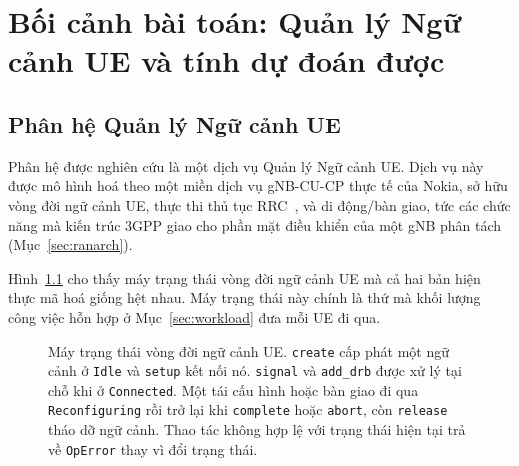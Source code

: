 \chapter{Bối cảnh bài toán: Quản lý Ngữ cảnh UE và tính dự đoán được\label{chapter:context}}

\section{Phân hệ Quản lý Ngữ cảnh UE}\label{sec:uecm}
Phân hệ được nghiên cứu là một dịch vụ Quản lý Ngữ cảnh UE. Dịch vụ này được mô hình hoá theo
một miền dịch vụ gNB-CU-CP thực tế của Nokia, sở hữu vòng đời ngữ cảnh UE, thực thi thủ tục
RRC~\cite{3gpp38331}, và di động/bàn giao, tức các chức năng mà kiến trúc 3GPP giao cho phần
mặt điều khiển của một gNB phân tách (Mục~\ref{sec:ranarch}).

Hình~\ref{fig:fsm} cho thấy máy trạng thái vòng đời ngữ cảnh UE mà cả hai bản hiện thực mã hoá
giống hệt nhau. Máy trạng thái này chính là thứ mà khối lượng công việc hỗn hợp ở
Mục~\ref{sec:workload} đưa mỗi UE đi qua.

\begin{figure}[ht]
\centering
{}
\caption[Máy trạng thái vòng đời ngữ cảnh UE]{Máy trạng thái vòng đời ngữ cảnh UE. \texttt{create} cấp phát một ngữ cảnh ở
\texttt{Idle} và \texttt{setup} kết nối nó. \texttt{signal} và \texttt{add\_drb} được xử lý tại
chỗ khi ở \texttt{Connected}. Một tái cấu hình hoặc bàn giao đi qua \texttt{Reconfiguring} rồi
trở lại khi \texttt{complete} hoặc \texttt{abort}, còn \texttt{release} tháo dỡ ngữ cảnh. Thao
tác không hợp lệ với trạng thái hiện tại trả về \texttt{OpError} thay vì đổi trạng thái.\label{fig:fsm}}
\end{figure}

